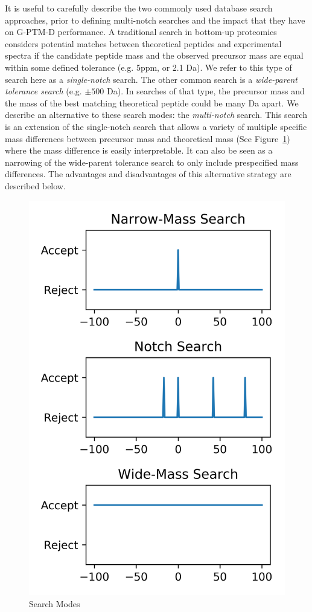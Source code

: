 \documentclass[journal=jprobs,manuscript=article]{achemso}
\begin{document}
It is useful to carefully describe the two commonly used database search approaches, prior to defining multi-notch searches and the impact that they have on G-PTM-D performance.
A traditional search in bottom-up proteomics considers potential matches between theoretical peptides and experimental spectra if the candidate peptide mass and the observed precursor mass are equal within some defined tolerance (e.g. 5ppm, or 2.1 Da).
We refer to this type of search here as a \textit{single-notch} search.
The other common search is a \textit{wide-parent tolerance search} (e.g. $\pm 500$ Da)\citep{Chick_2015,Kong_2017,Li_2016}.
In searches of that type, the precursor mass and the mass of the best matching theoretical peptide could be many Da apart.
We describe an alternative to these search modes: the \textit{multi-notch} search.
This search is an extension of the single-notch search that allows a variety of multiple specific mass differences between precursor mass and theoretical mass (See Figure~\ref{fig:fig3-searchTypes}) where the mass difference is easily interpretable.
It can also be seen as a narrowing of the wide-parent tolerance search to only include prespecified mass differences.
The advantages and disadvantages of this alternative strategy are described below.

\begin{figure}[H]
\includegraphics{fig3-searchTypes.png}
\caption{Search Modes}
\label{fig:fig3-searchTypes}
\end{figure}
\end{document}
